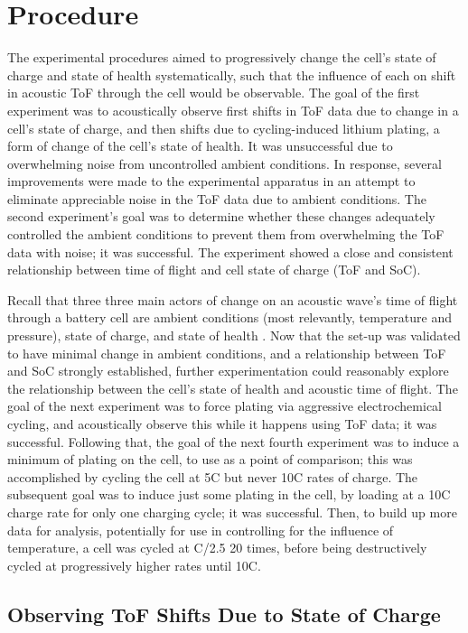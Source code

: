 \chapter{Procedure}
The experimental procedures aimed to progressively change the cell's state of charge and state of health systematically, such that the influence of each on shift in acoustic ToF through the cell would be observable.
The goal of the first experiment was to acoustically observe first shifts in ToF data due to change in a cell's state of charge, and then shifts due to cycling-induced lithium plating, a form of change of the cell's state of health. 
It was unsuccessful due to overwhelming noise from uncontrolled ambient conditions. 
In response, several improvements were made to the experimental apparatus in an attempt to eliminate appreciable noise in the ToF data due to ambient conditions. 
The second experiment's goal was to determine whether these changes adequately controlled the ambient conditions to prevent them from overwhelming the ToF data with noise; it was successful. 
The experiment showed a close and consistent relationship between time of flight and cell state of charge (ToF and SoC).

Recall that three three main actors of change on an acoustic wave's time of flight through a battery cell are ambient conditions (most relevantly, temperature and pressure), state of charge, and state of health . Now that the set-up was validated to have minimal change in ambient conditions, and a relationship between ToF and SoC strongly established, further experimentation could reasonably explore the relationship between the cell's state of health and acoustic time of flight. The goal of the next experiment was to force plating via aggressive electrochemical cycling, and acoustically observe this while it happens using ToF data; it was successful. Following that, the goal of the next fourth experiment was to induce a minimum of plating on the cell, to use as a point of comparison; this was accomplished by cycling the cell at 5C but never 10C rates of charge. The subsequent goal was to induce just some plating in the cell, by loading at a 10C charge rate for only one charging cycle; it was successful. Then, to build up more data for analysis, potentially for use in controlling for the influence of temperature, a cell was cycled at C/2.5 20 times, before being destructively cycled at progressively higher rates until 10C.

\section{Observing ToF Shifts Due to State of Charge}

